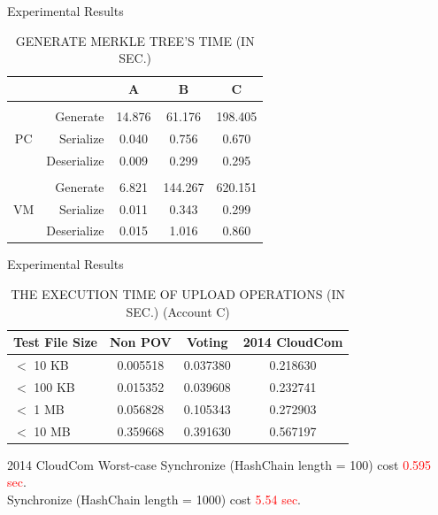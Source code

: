 \documentclass{beamer}
\newcommand{\tab}[1]{\hspace{.1\textwidth}\rlap{#1}}
\begin{document}
\begin{CJK}{UTF8}{bkai}
\begin{frame}{Experimental Results}
\begin{table}[]
		\caption{GENERATE MERKLE TREE'S TIME (IN SEC.)}
		\begin{tabular}{|c|r|c|c|c|}
			\hline
			   &             & A      & B       & C       \\ \hline
               &             &        &		    &		  \\ \hline
			   & Generate    & 14.876 & 61.176  & 198.405 \\ \cline{2-5} 
			PC & Serialize   & 0.040  & 0.756   & 0.670   \\ \cline{2-5} 
			   & Deserialize & 0.009  & 0.299   & 0.295   \\ \hline
		   	   &             &        &         &         \\ \hline
			   & Generate    & 6.821  & 144.267 & 620.151 \\ \cline{2-5} 
			VM & Serialize   & 0.011  & 0.343   & 0.299   \\ \cline{2-5} 
			   & Deserialize & 0.015  & 1.016   & 0.860   \\
			\hline
		\end{tabular}
	\end{table}
\end{frame}

\begin{frame}{Experimental Results}
	\scriptsize
	\begin{table}
    	\large
		\centering
		\caption{THE EXECUTION TIME OF \alert{UPLOAD} OPERATIONS (IN SEC.) (Account C)}
		\begin{tabular}{lccc}      	
            Test File Size & Non POV  & Voting   & 2014 CloudCom \\ \hline
            $<$ 10 KB      & 0.005518 & 0.037380 & 0.218630      \\ \hline
            $<$ 100 KB     & 0.015352 & 0.039608 & 0.232741      \\ \hline
            $<$ 1 MB       & 0.056828 & 0.105343 & 0.272903      \\ \hline
            $<$ 10 MB      & 0.359668 & 0.391630 & 0.567197      \\
		\end{tabular}
	\end{table}
    \begin{alertblock}{2014 CloudCom Worst-case}
    	\normalsize
    	\tab{} Synchronize (HashChain length = 100) cost \textcolor{red}{0.595 sec}. \\
        \tab{} Synchronize (HashChain length = 1000) cost \textcolor{red}{5.54 sec}.
    \end{alertblock}
\end{frame}


\end{CJK}
\end{document}
